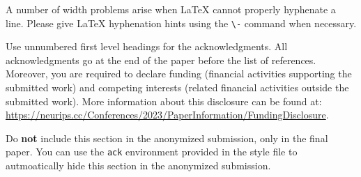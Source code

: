 \documentclass{article}
\begin{document}
A number of width problems arise when \LaTeX{} cannot properly hyphenate a
line. Please give LaTeX hyphenation hints using the \verb+\-+ command when
necessary.


\begin{ack}
Use unnumbered first level headings for the acknowledgments. All acknowledgments
go at the end of the paper before the list of references. Moreover, you are required to declare
funding (financial activities supporting the submitted work) and competing interests (related financial activities outside the submitted work).
More information about this disclosure can be found at: \url{https://neurips.cc/Conferences/2023/PaperInformation/FundingDisclosure}.


Do {\bf not} include this section in the anonymized submission, only in the final paper. You can use the \texttt{ack} environment provided in the style file to autmoatically hide this section in the anonymized submission.
\end{ack}







\end{document}
